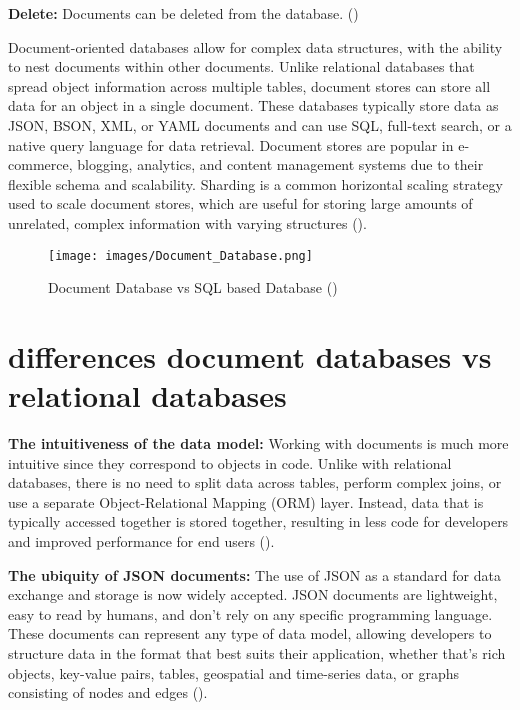 \textbf{Delete:} Documents can be deleted from the database.
(\cite{mongodb-mongo})






Document-oriented databases allow for complex data structures, with the ability to nest documents within other documents. Unlike relational databases that spread object information across multiple tables, document stores can store all data for an object in a single document. These databases typically store data as JSON, BSON, XML, or YAML documents and can use SQL, full-text search, or a native query language for data retrieval. Document stores are popular in e-commerce, blogging, analytics, and content management systems due to their flexible schema and scalability. Sharding is a common horizontal scaling strategy used to scale document stores, which are useful for storing large amounts of unrelated, complex information with varying structures (\cite{mongodb-Comparison}).
\begin{figure}[H]
    \centering
    \texttt{[image: images/Document\_Database.png]}
        \caption{Document Database vs SQL based Database (\cite{mogngodb-image})}
    \label{fig:Software pricing Overview}
\end{figure}

\section{differences document databases vs relational databases}
\textbf{The intuitiveness of the data model:} Working with documents is much more intuitive since they correspond to objects in code. Unlike with relational databases, there is no need to split data across tables, perform complex joins, or use a separate Object-Relational Mapping (ORM) layer. Instead, data that is typically accessed together is stored together, resulting in less code for developers and improved performance for end users (\cite{mongodb-mongo}).

\textbf{The ubiquity of JSON documents:} The use of JSON as a standard for data exchange and storage is now widely accepted. JSON documents are lightweight, easy to read by humans, and don't rely on any specific programming language. These documents can represent any type of data model, allowing developers to structure data in the format that best suits their application, whether that's rich objects, key-value pairs, tables, geospatial and time-series data, or graphs consisting of nodes and edges (\cite{mongodb-mongo}).

